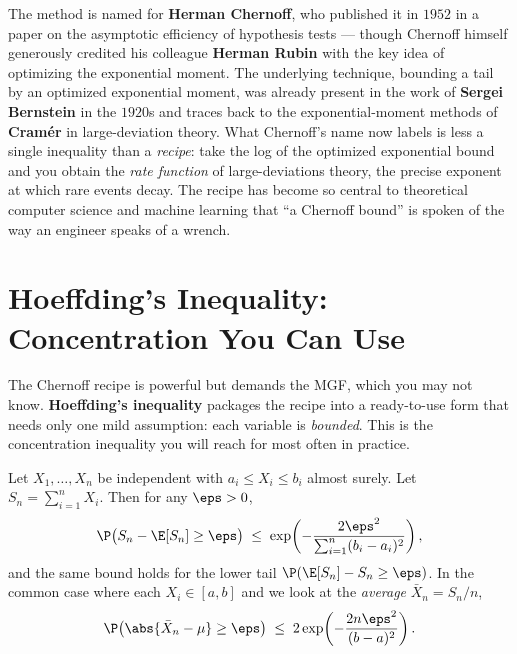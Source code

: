 \begin{historybox}
The method is named for \textbf{Herman Chernoff}, who published it in $1952$ in
a paper on the asymptotic efficiency of hypothesis tests --- though Chernoff
himself generously credited his colleague \textbf{Herman Rubin} with the key
idea of optimizing the exponential moment. The underlying technique, bounding a
tail by an optimized exponential moment, was already present in the work of
\textbf{Sergei Bernstein} in the $1920$s and traces back to the
exponential-moment methods of \textbf{Cram\'er} in large-deviation theory.
What Chernoff's name now labels is less a single inequality than a
\emph{recipe}: take the log of the optimized exponential bound and you obtain
the \emph{rate function} of large-deviations theory, the precise exponent at
which rare events decay. The recipe has become so central to theoretical
computer science and machine learning that ``a Chernoff bound'' is spoken of
the way an engineer speaks of a wrench.
\end{historybox}

\section{Hoeffding's Inequality: Concentration You Can Use}
\label{ch19:hoeffding}

The Chernoff recipe is powerful but demands the MGF, which you may not know.
\textbf{Hoeffding's inequality} packages the recipe into a ready-to-use form
that needs only one mild assumption: each variable is \emph{bounded}. This is
the concentration inequality you will reach for most often in practice.

\begin{theorem}
\label{ch19:hoeff-thm}
Let $X_1, \dots, X_n$ be independent with $a_i \le X_i \le b_i$ almost surely.
Let $S_n = \sum_{i=1}^n X_i$. Then for any $\eps > 0$,
\[
  \P\bigl(S_n - \E[S_n] \ge \eps\bigr)
  \;\le\;
  \exp\!\left(-\frac{2\eps^2}{\sum_{i=1}^n (b_i - a_i)^2}\right),
\]
and the same bound holds for the lower tail $\P(\E[S_n] - S_n \ge \eps)$. In
the common case where each $X_i \in [a,b]$ and we look at the
\emph{average} $\bar X_n = S_n/n$,
\[
  \P\bigl(\abs{\bar X_n - \mu} \ge \eps\bigr)
  \;\le\;
  2\exp\!\left(-\frac{2 n \eps^2}{(b-a)^2}\right).
\]
\end{theorem}

